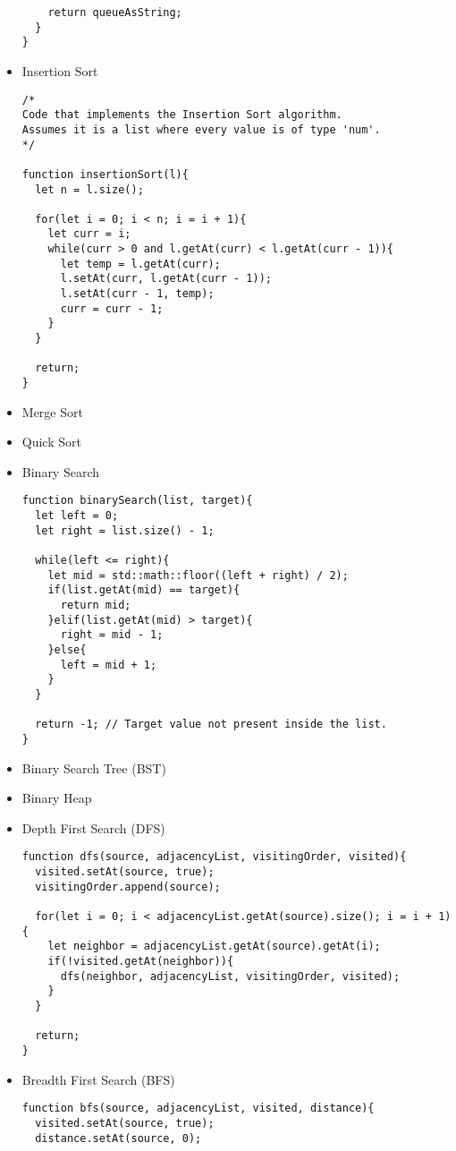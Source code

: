 \begin{itemize}
\begin{lstlisting}
    return queueAsString;
  }
}
        \end{lstlisting}


    \item Insertion Sort
        \begin{lstlisting}
/*
Code that implements the Insertion Sort algorithm.
Assumes it is a list where every value is of type 'num'.
*/

function insertionSort(l){
  let n = l.size();

  for(let i = 0; i < n; i = i + 1){
    let curr = i;
    while(curr > 0 and l.getAt(curr) < l.getAt(curr - 1)){
      let temp = l.getAt(curr);
      l.setAt(curr, l.getAt(curr - 1));
      l.setAt(curr - 1, temp);
      curr = curr - 1;
    }
  }

  return;
}
        \end{lstlisting}
    \item Merge Sort
    \item Quick Sort
    \item Binary Search
        \begin{lstlisting}
function binarySearch(list, target){
  let left = 0;
  let right = list.size() - 1;

  while(left <= right){
    let mid = std::math::floor((left + right) / 2);
    if(list.getAt(mid) == target){
      return mid;
    }elif(list.getAt(mid) > target){
      right = mid - 1;
    }else{
      left = mid + 1;
    }
  }

  return -1; // Target value not present inside the list.
}
        \end{lstlisting}
    \item Binary Search Tree (BST)
    \item Binary Heap
    \item Depth First Search (DFS)
        \begin{lstlisting}
function dfs(source, adjacencyList, visitingOrder, visited){
  visited.setAt(source, true);
  visitingOrder.append(source);

  for(let i = 0; i < adjacencyList.getAt(source).size(); i = i + 1){
    let neighbor = adjacencyList.getAt(source).getAt(i);
    if(!visited.getAt(neighbor)){
      dfs(neighbor, adjacencyList, visitingOrder, visited);
    }
  }

  return;
}
        \end{lstlisting}
    \item Breadth First Search (BFS)
        \begin{lstlisting}
function bfs(source, adjacencyList, visited, distance){
  visited.setAt(source, true);
  distance.setAt(source, 0);


\end{lstlisting}
\end{itemize}
